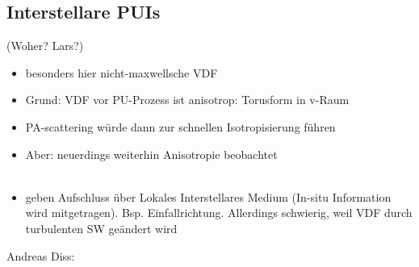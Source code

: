 \documentclass[]{article}
\begin{document}
\subsection{Interstellare PUIs}
(Woher? Lars?)
\begin{itemize}
	\item besonders hier nicht-maxwellsche VDF
	\item Grund: VDF vor PU-Prozess ist anisotrop: Torusform in v-Raum
	\item PA-scattering würde dann zur schnellen Isotropisierung führen
	\item Aber: neuerdings weiterhin Anisotropie beobachtet \\ \\
	\item geben Aufschluss über Lokales Interstellares Medium (In-situ Information wird mitgetragen). Bsp. Einfallrichtung. Allerdings schwierig, weil VDF durch turbulenten SW geändert wird
\end{itemize}
Andreas Diss:
\end{document}
